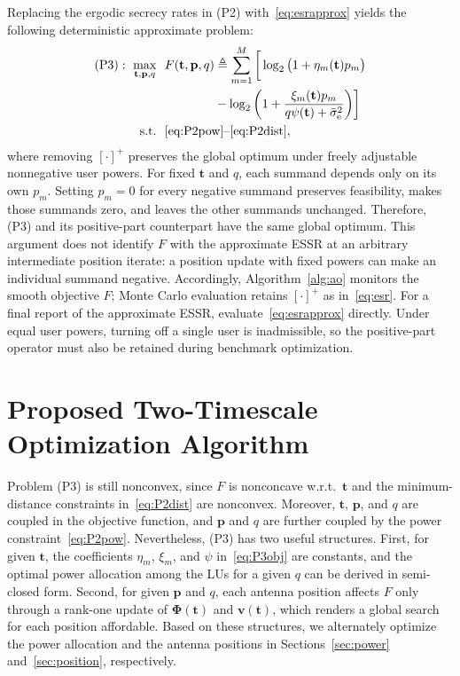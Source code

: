 \documentclass[journal]{IEEEtran}
\newcommand{\bt}{\mathbf{t}}
\newcommand{\bv}{\mathbf{v}}
\newcommand{\bp}{\mathbf{p}}
\newcommand{\bPhi}{\boldsymbol{\Phi}}
\newcommand{\sbe}{\bar{\sigma}_{\mathrm{e}}^2}
\begin{document}
Replacing the ergodic secrecy rates in (P2) with~\eqref{eq:esrapprox} yields the following deterministic approximate problem:
\begin{subequations}\label{eq:P3}
\begin{align}
(\mathrm{P3}):\ \max_{\bt,\bp,q}\ \ & F(\bt,\bp,q)\triangleq\sum_{m=1}^{M}\bigg[\log_2\big(1+\eta_m(\bt)p_m\big)\nonumber\\
&\qquad\qquad-\log_2\bigg(1+\frac{\xi_m(\bt)p_m}{q\psi(\bt)+\sbe}\bigg)\bigg]\label{eq:P3obj}\\
\mathrm{s.t.}\ \ & \eqref{eq:P2pow}\text{--}\eqref{eq:P2dist},\nonumber
\end{align}
\end{subequations}
where removing $[\cdot]^+$ preserves the global optimum under freely adjustable nonnegative user powers. For fixed $\bt$ and $q$, each summand depends only on its own $p_m$. Setting $p_m=0$ for every negative summand preserves feasibility, makes those summands zero, and leaves the other summands unchanged. Therefore, (P3) and its positive-part counterpart have the same global optimum. This argument does not identify $F$ with the approximate ESSR at an arbitrary intermediate position iterate: a position update with fixed powers can make an individual summand negative. Accordingly, Algorithm~\ref{alg:ao} monitors the smooth objective $F$; Monte Carlo evaluation retains $[\cdot]^+$ as in~\eqref{eq:esr}. For a final report of the approximate ESSR, evaluate~\eqref{eq:esrapprox} directly. Under equal user powers, turning off a single user is inadmissible, so the positive-part operator must also be retained during benchmark optimization.

\section{Proposed Two-Timescale Optimization Algorithm}\label{sec:opt}
Problem (P3) is still nonconvex, since $F$ is nonconcave w.r.t.\ $\bt$ and the minimum-distance constraints in~\eqref{eq:P2dist} are nonconvex. Moreover, $\bt$, $\bp$, and $q$ are coupled in the objective function, and $\bp$ and $q$ are further coupled by the power constraint~\eqref{eq:P2pow}. Nevertheless, (P3) has two useful structures. First, for given $\bt$, the coefficients $\eta_m$, $\xi_m$, and $\psi$ in~\eqref{eq:P3obj} are constants, and the optimal power allocation among the LUs for a given $q$ can be derived in semi-closed form. Second, for given $\bp$ and $q$, each antenna position affects $F$ only through a rank-one update of $\bPhi(\bt)$ and $\bv(\bt)$, which renders a global search for each position affordable. Based on these structures, we alternately optimize the power allocation and the antenna positions in Sections~\ref{sec:power} and~\ref{sec:position}, respectively.
\end{document}
